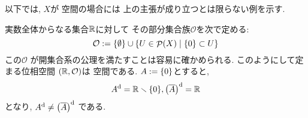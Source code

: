 \documentclass[uplatex, dvipdfmx, a4paper, 12pt, class=jsarticle, crop=false]{standalone}
\begin{document}
	以下では, \( X \)が  空間の場合には
	上の主張が成り立つとは限らない例を示す.

	実数全体からなる集合\( \mathbb{R} \)に対して
	その部分集合族\( \mathcal{O} \)を次で定める:
	\[ \mathcal{O} \defeq \lrbrace{\emptyset}
	\cup \setcomp{U \in \pow(X)}
	{\lrbrace{0} \subset U} \]
	この\( \mathcal{O} \)
	が開集合系の公理を満たすことは容易に確かめられる.
	このようにして定まる位相空間
	\( (\mathbb{R}, \mathcal{O}) \)は  空間である.
	\( A \defeq \lrbrace{0} \)とすると,
	\[A^\topd = \R \setminus \lrbrace{0},
	\lrparen{\topbar{A}}^\topd = \R\]
	となり,
	\( A^\topd \neq \lrparen{\topbar{A}}^\topd \)
	である.
\end{document}
